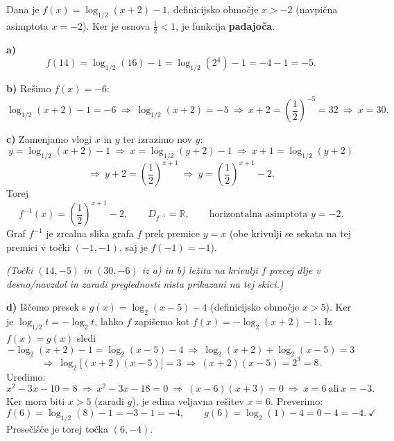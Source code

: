 \documentclass[a4paper,12pt]{letter}
\begin{document}
\begin{resitev}
Dana je $f(x)=\log_{1/2}(x+2)-1$, definicijsko obmo\v{c}je $x>-2$ (navpi\v{c}na asimptota $x=-2$). Ker je osnova $\tfrac12<1$, je funkcija \textbf{padajo\v{c}a}.

\textbf{a)}
\[
f(14)=\log_{1/2}(16)-1=\log_{1/2}\!\left(2^4\right)-1=-4-1=-5.
\]

\textbf{b)} Re\v{s}imo $f(x)=-6$:
\[
\log_{1/2}(x+2)-1=-6\ \Longrightarrow\ \log_{1/2}(x+2)=-5\ \Longrightarrow\ x+2=\left(\frac12\right)^{-5}=32\ \Longrightarrow\ x=30.
\]

\textbf{c)} Zamenjamo vlogi $x$ in $y$ ter izrazimo nov $y$:
\[
y=\log_{1/2}(x+2)-1\ \Longrightarrow\ x=\log_{1/2}(y+2)-1\ \Longrightarrow\ x+1=\log_{1/2}(y+2)
\]
\[
\Longrightarrow\ y+2=\left(\frac12\right)^{x+1}\ \Longrightarrow\ y=\left(\frac12\right)^{x+1}-2.
\]
Torej
\[
f^{-1}(x)=\left(\frac12\right)^{x+1}-2,\qquad D_{f^{-1}}=\mathbb R,\qquad \text{horizontalna asimptota } y=-2.
\]
Graf $f^{-1}$ je zrcalna slika grafa $f$ prek premice $y=x$ (obe krivulji se sekata na tej premici v to\v{c}ki $(-1,-1)$, saj je $f(-1)=-1$).

\begin{center}
\end{center}
\emph{(To\v{c}ki $(14,-5)$ in $(30,-6)$ iz a) in b) le\v{z}ita na krivulji $f$ precej dlje v desno/navzdol in zaradi preglednosti nista prikazani na tej skici.)}

\textbf{d)} I\v{s}\v{c}emo presek s $g(x)=\log_2(x-5)-4$ (definicijsko obmo\v{c}je $x>5$). Ker je $\log_{1/2}t=-\log_2 t$, lahko $f$ zapi\v{s}emo kot $f(x)=-\log_2(x+2)-1$. Iz $f(x)=g(x)$ sledi
\[
-\log_2(x+2)-1=\log_2(x-5)-4\ \Longrightarrow\ \log_2(x+2)+\log_2(x-5)=3
\]
\[
\Longrightarrow\ \log_2\big[(x+2)(x-5)\big]=3\ \Longrightarrow\ (x+2)(x-5)=2^3=8.
\]
Uredimo:
\[
x^2-3x-10=8\ \Longrightarrow\ x^2-3x-18=0\ \Longrightarrow\ (x-6)(x+3)=0\ \Longrightarrow\ x=6\ \text{ali}\ x=-3.
\]
Ker mora biti $x>5$ (zaradi $g$), je edina veljavna re\v{s}itev $x=6$. Preverimo:
\[
f(6)=\log_{1/2}(8)-1=-3-1=-4,\qquad g(6)=\log_2(1)-4=0-4=-4.\ \checkmark
\]
Prese\v{c}i\v{s}\v{c}e je torej to\v{c}ka $(6,-4)$.
\end{resitev}
\end{document}

